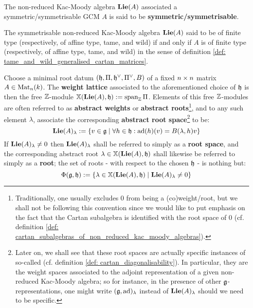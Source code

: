             \begin{convention} \label{conv: tame_and_wild_non_reduced_kac_moody_algebras}
                The non-reduced Kac-Moody algebra $\mathbf{Lie}(A)$ associated a symmetric/symmetrisable GCM $A$ is said to be \textbf{symmetric/symmetrisable}.
                
                The symmetrisable non-reduced Kac-Moody algebra $\mathbf{Lie}(A)$ said to be of finite type (respectively, of affine type, tame, and wild) if and only if $A$ is of finite type (respectively, of affine type, tame, and wild) in the sense of definition \ref{def: tame_and_wild_generalised_cartan_matrices}.
            \end{convention}
            
            \begin{definition} \label{def: weight_lattices_and_abstract_root_spaces}
                Choose a minimal root datum $(\mathfrak{h}, \Pi, \mathfrak{h}^{\vee}, \Pi^{\vee}, B)$ of a fixed $n \x n$ matrix $A \in \mathrm{Mat}_n(k)$. The \textbf{weight lattice} associated to the aforementioned choice of $\mathfrak{h}$ is then the free $\mathbb{Z}$-module $\mathbb{X}(\mathbf{Lie}(A), \mathfrak{h}) := \operatorname{span}_{\mathbb{Z}} \Pi$. Elements of this free $\mathbb{Z}$-modules are often referred to as \textbf{abstract weights} or \textbf{abstract roots}\footnote{Traditionally, one usually excludes $0$ from being a (co)weight/root, but we shall not be following this convention since we would like to put emphasis on the fact that the Cartan subalgebra is identified with the root space of $0$ (cf. definition \ref{def: cartan_subalgebras_of_non_reduced_kac_moody_algebras}).}, and to any such element $\lambda$, associate the corresponding \textbf{abstract root space}\footnote{Later on, we shall see that these root spaces are actually specific instances of so-called  (cf. definition \ref{def: cartan_diagonalisability}). In particular, they are the weight spaces associated to the adjoint representation of a given non-reduced Kac-Moody algebra; so for instance, in the presence of other $\mathfrak{g}$-representations, one might write $(\mathfrak{g}, \mathrm{ad})_{\lambda}$ instead of $\mathbf{Lie}(A)_{\lambda}$ should we need to be specific.} to be:
                    $$\mathbf{Lie}(A)_{\lambda} := \{v \in \mathfrak{g} \mid \forall h \in \mathfrak{h}: \mathrm{ad}(h)(v) = B(\lambda, h)v\}$$
                If $\mathbf{Lie}(A)_{\lambda} \not = 0$ then $\mathbf{Lie}(A)_{\lambda}$ shall be referred to simply as a \textbf{root space}, and the corresponding abstract root $\lambda \in \mathbb{X}(\mathbf{Lie}(A), \mathfrak{h})$ shall likewise be referred to simply as a \textbf{root}; the set of roots - with respect to the chosen $\mathfrak{h}$ - is nothing but:
                    $$\Phi(\mathfrak{g}, \mathfrak{h}) := \{\lambda \in \mathbb{X}(\mathbf{Lie}(A), \mathfrak{h}) \mid \mathbf{Lie}(A)_{\lambda} \not = 0\}$$
            \end{definition}
